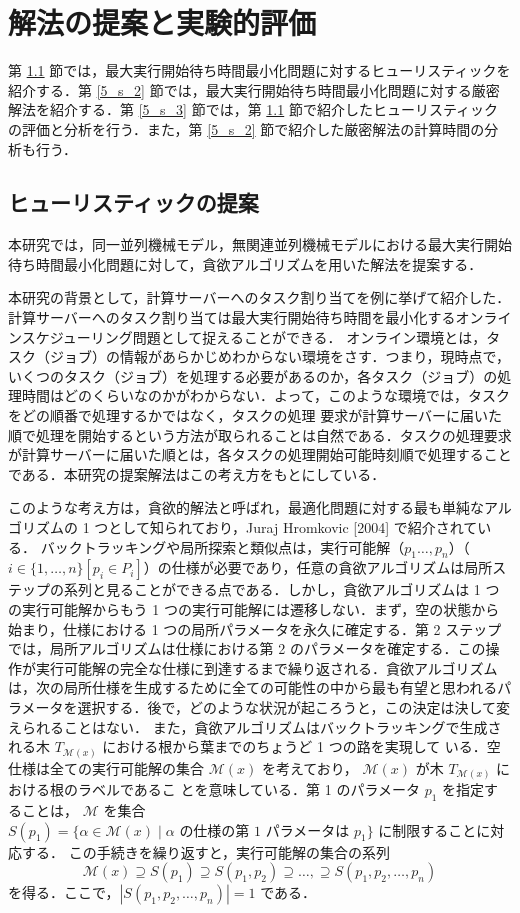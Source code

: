 \documentclass[12pt]{optlab-bachelor}
\begin{document}
\chapter{解法の提案と実験的評価}\label{c_5}
第 \ref{5_s_1} 節では，最大実行開始待ち時間最小化問題に対するヒューリスティックを紹介する．第 \ref{5_s_2} 節では，最大実行開始待ち時間最小化問題に対する厳密解法を紹介する．第 \ref{5_s_3} 節では，第 \ref{5_s_1} 節で紹介したヒューリスティックの評価と分析を行う．また，第 \ref{5_s_2} 節で紹介した厳密解法の計算時間の分析も行う．

\section{ヒューリスティックの提案}\label{5_s_1}
本研究では，同一並列機械モデル，無関連並列機械モデルにおける最大実行開始待ち時間最小化問題に対して，貪欲アルゴリズムを用いた解法を提案する．

本研究の背景として，計算サーバーへのタスク割り当てを例に挙げて紹介した．
計算サーバーへのタスク割り当ては最大実行開始待ち時間を最小化するオンラインスケジューリング問題として捉えることができる．
オンライン環境とは，タスク（ジョブ）の情報があらかじめわからない環境をさす．つまり，現時点で，いくつのタスク（ジョブ）を処理する必要があるのか，各タスク（ジョブ）の処理時間はどのくらいなのかがわからない．よって，このような環境では，タスクをどの順番で処理するかではなく，タスクの処理
要求が計算サーバーに届いた順で処理を開始するという方法が取られることは自然である．タスクの処理要求が計算サーバーに届いた順とは，各タスクの処理開始可能時刻順で処理することである．本研究の提案解法はこの考え方をもとにしている．

このような考え方は，貪欲的解法と呼ばれ，最適化問題に対する最も単純なアルゴリズムの 1 つとして知られており，Juraj Hromkovic [2004] \cite{greedy} で紹介されている．
バックトラッキングや局所探索と類似点は，実行可能解（$p_1\ldots,p_n$）（$i \in \{1,\ldots,n\}[p_i \in P_i]$）の仕様が必要であり，任意の貪欲アルゴリズムは局所ステップの系列と見ることができる点である．しかし，貪欲アルゴリズムは 1 つの実行可能解からもう 1 つの実行可能解には遷移しない．まず，空の状態から始まり，仕様における 1 つの局所パラメータを永久に確定する．第 2 ステップでは，局所アルゴリズムは仕様における第 2 のパラメータを確定する．この操作が実行可能解の完全な仕様に到達するまで繰り返される．貪欲アルゴリズムは，次の局所仕様を生成するために全ての可能性の中から最も有望と思われるパラメータを選択する．後で，どのような状況が起ころうと，この決定は決して変えられることはない．
また，貪欲アルゴリズムはバックトラッキングで生成される木
$T_{\mathcal{M}(x)}$ における根から葉までのちょうど 1 つの路を実現して
いる．空仕様は全ての実行可能解の集合 $\mathcal{M}(x)$ を考えており，
$\mathcal{M}(x)$ が木 $T_{\mathcal{M}(x)}$ における根のラベルであるこ
とを意味している．第 1 のパラメータ $p_1$ を指定することは，
$\mathcal{M}$ を集合 $S(p_1) = \{\alpha \in \mathcal{M}(x) \mid \alpha
\text{ の仕様の第 1 パラメータは } p_1\}$ に制限することに対応する．
この手続きを繰り返すと，実行可能解の集合の系列
$$\mathcal{M}(x) \supseteq S(p_1) \supseteq S(p_1,p_2) \supseteq
\ldots, \supseteq S(p_1,p_2,\ldots,p_n)$$
を得る．ここで，$|S(p_1,p_2,\ldots,p_n)| = 1$ である．\\
\end{document}
